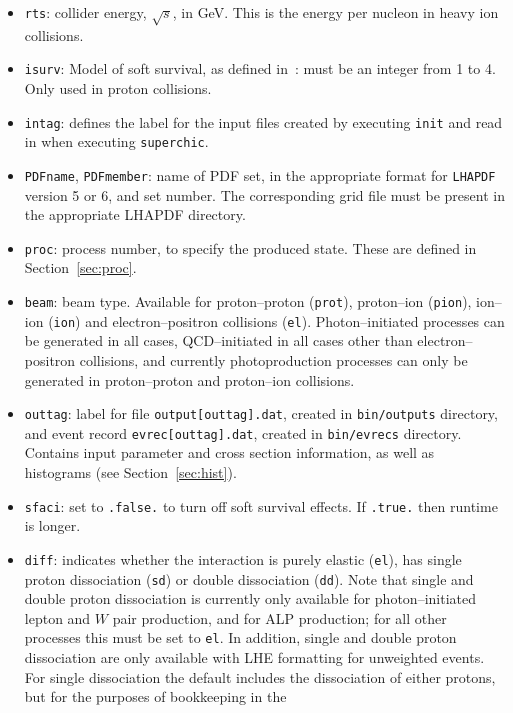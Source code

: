 \documentclass[12pt]{article}
\begin{document}
\begin{itemize}
\item \texttt{rts}: collider energy, $\sqrt{s}$, in GeV. This is the energy per nucleon in heavy ion collisions.
\item \texttt{isurv}: Model of soft survival, as defined in~\cite{Khoze:2013dha}: must be an integer from 1 to 4. 
Only used in proton collisions.
\item \texttt{intag}:  defines the label for the input files created by executing \texttt{init} and read in when 
executing \texttt{superchic}.
\item \texttt{PDFname}, \texttt{PDFmember}: name of PDF set, in the appropriate format for \texttt{LHAPDF} version 
5 or 6, and set number. The corresponding grid file must be present in the appropriate LHAPDF directory.
\item \texttt{proc}: process number, to specify the produced state. These are defined in Section~\ref{sec:proc}.
\item \texttt{beam}: beam type. Available for proton--proton (\texttt{prot}), proton--ion (\texttt{pion}), 
ion--ion (\texttt{ion}) and electron--positron collisions (\texttt{el}). Photon--initiated processes can be 
generated in all cases, QCD--initiated in all cases other than electron--positron collisions, and currently 
photoproduction processes can only be generated in proton--proton and proton--ion collisions.
\item \texttt{outtag}: label for file \texttt{output[outtag].dat}, created in \texttt{bin/outputs} directory, and 
event record  \texttt{evrec[outtag].dat}, created in \texttt{bin/evrecs} directory. Contains input parameter and 
cross section information, as well as histograms (see Section~\ref{sec:hist}).
\item \texttt{sfaci}: set to \texttt{.false.} to turn off soft survival effects. If \texttt{.true.} then runtime 
is longer.
\item \texttt{diff}: indicates whether the interaction is purely elastic (\texttt{el}), has single proton 
dissociation (\texttt{sd}) or double dissociation (\texttt{dd}).
Note that single and double proton dissociation is currently only available for photon--initiated lepton and $W$ 
pair production, and for ALP production; for all other processes this must be set to \texttt{el}. In addition, 
single and double proton dissociation are only available with LHE formatting for unweighted events. For single 
dissociation the default includes the dissociation of either protons, but for the purposes of bookkeeping in the 

\end{itemize}
\end{document}
